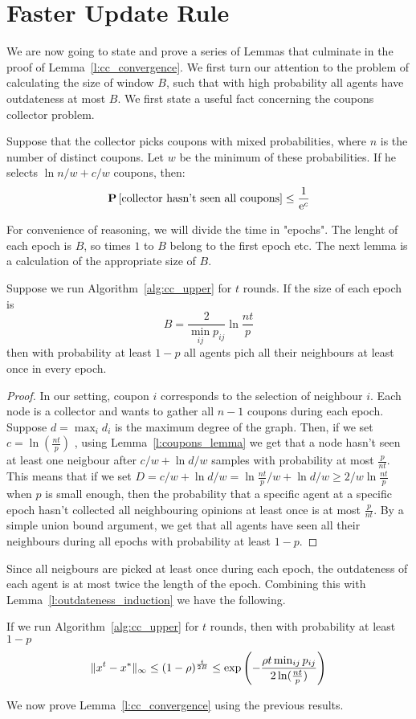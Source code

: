 \section{Faster Update Rule}\label{app:s:cc_convergence}
We are now going to state and prove a series of Lemmas that culminate in 
the proof of Lemma~\ref{l:cc_convergence}. We first turn our attention to
the problem of calculating the size of window $B$, such that with high probability
all agents have outdateness at most $B$. 
We first state a useful fact concerning the coupons collector problem.

\begin{lemma}\label{l:coupons_lemma}
Suppose that the collector picks coupons with mixed 
probabilities, where $n$ is the number of distinct coupons.
Let $w$ be the minimum of these probabilities. 
If he selects $\ln n/w+ c/w$ coupons, then:
$$
\bm{\mathrm{P}}\left[\text{collector hasn't seen all coupons}\right] \leq \frac{1}{\mathrm{e}^c}
$$
\end{lemma}

For convenience of reasoning, we will divide the time in "epochs". 
The lenght of each epoch is $B$, so times $1$ to $B$ belong to the first 
epoch etc. 
The next lemma is a calculation of the appropriate size of $B$.
\begin{lemma}
Suppose we run Algorithm~\ref{alg:cc_upper} for $t$ rounds. If the size of
each epoch is 
\[
B = \frac{2}{\min_{ij}p_{ij}}\ln \frac{nt}{p}
\]
then with probability at least $1-p$ all agents pich all their neighbours 
at least once in every epoch. 
\end{lemma}
\begin{proof}
In our setting, coupon $i$ corresponds to the selection of neighbour $i$. Each node is a 
collector and wants to gather all $n-1$ coupons during each epoch. 
Suppose $d = \max_i d_i$ is the maximum degree of the graph. 
Then, if we set  $c = \ln (\frac{nt}{p})$ , using Lemma~\ref{l:coupons_lemma} 
we get that a node hasn't seen at least one neigbour after $c/w + \ln d/w$ samples 
with probability at most $\frac{p}{nt}$. This means that if we set 
$D = c/w + \ln d/w =  \ln \frac{nt}{p}/w +  \ln d/w \geq 2/w\ln\frac{nt}{p} $ when $p$ is 
small enough, then the probability that a specific agent at a specific epoch hasn't collected 
all neighbouring opinions at least once is at most $\frac{p}{nt}$. By a simple union bound argument, 
we get that all agents have seen all their neighbours during all epochs
 with probability at least $1 - p$.
\end{proof}
Since all neigbours are picked at least once during each epoch,
the outdateness of each agent is at most twice the length of the 
epoch. Combining this with Lemma~\ref{l:outdateness_induction} we have 
the following.
\begin{corollary}\label{cor:window}
If we run Algorithm~\ref{alg:cc_upper} for $t$ rounds, then with probability at least 
$1-p$
$$ \| x^{t}-x^* \|_{\infty} \leq (1-\rho)^{\frac{t}{2B}} 
\leq \exp \left(-\frac{\rho t\min_{ij}p_{ij}}{2\ln( \frac{nt}{p})} \right)$$
\end{corollary}
We now prove Lemma~\ref{l:cc_convergence} using the previous results.

